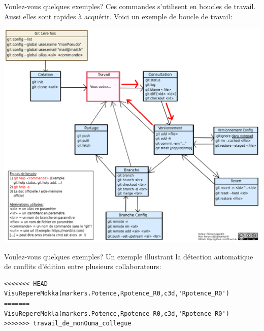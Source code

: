 \documentclass{beamer}
\begin{document}
\begin{frame}{Voulez-vous quelques exemples?}
Ces commandes s'utilisent en boucles de travail. Aussi elles sont rapides à acquérir. Voici un exemple de boucle de travail:
\begin{center}
    \includegraphics[scale=0.25]{images/comment/gitCommandFlow_localLoop.png}
\end{center}
\end{frame}

\begin{frame}[fragile]{Voulez-vous quelques exemples?}
Un exemple illustrant la détection automatique de conflits d'édition entre plusieurs collaborateurs:
\begin{mdframed}[style=Bash]
\begin{lstlisting}[style=Bash, caption={Exemple de détection automatique de conflit d'édition}]
<<<<<<< HEAD
VisuRepereMokka(markers.Potence,Rpotence_R0,c3d,'Rpotence_R0')
=======
VisuRepereMokla(markers.Potence,Rpotence_R0,c3d,'Rpotence_R0')
>>>>>>> travail_de_monOuma_collegue
\end{lstlisting}
\end{mdframed}
\end{frame}
\end{document}
